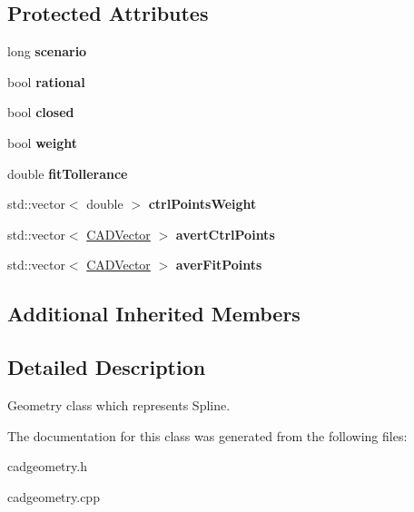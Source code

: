 \subsection*{Protected Attributes}
\begin{DoxyCompactItemize}
\item 
long {\bfseries scenario}\hypertarget{class_c_a_d_spline_a3694c63ea80eef24a1a31a0da4d3ef64}{}\label{class_c_a_d_spline_a3694c63ea80eef24a1a31a0da4d3ef64}

\item 
bool {\bfseries rational}\hypertarget{class_c_a_d_spline_a0b52ed3223ee5db7381468131b031d64}{}\label{class_c_a_d_spline_a0b52ed3223ee5db7381468131b031d64}

\item 
bool {\bfseries closed}\hypertarget{class_c_a_d_spline_af28e1bca878a13fdfa0d8ad48168b763}{}\label{class_c_a_d_spline_af28e1bca878a13fdfa0d8ad48168b763}

\item 
bool {\bfseries weight}\hypertarget{class_c_a_d_spline_ae8d3331548fdc5558603d9c5dde9eafc}{}\label{class_c_a_d_spline_ae8d3331548fdc5558603d9c5dde9eafc}

\item 
double {\bfseries fit\+Tollerance}\hypertarget{class_c_a_d_spline_a1b6b07b03f68c241dc1e4829172b36a7}{}\label{class_c_a_d_spline_a1b6b07b03f68c241dc1e4829172b36a7}

\item 
std\+::vector$<$ double $>$ {\bfseries ctrl\+Points\+Weight}\hypertarget{class_c_a_d_spline_ad4fb6172b48df3e9d9dc0d37b3efec56}{}\label{class_c_a_d_spline_ad4fb6172b48df3e9d9dc0d37b3efec56}

\item 
std\+::vector$<$ \hyperlink{class_c_a_d_vector}{C\+A\+D\+Vector} $>$ {\bfseries avert\+Ctrl\+Points}\hypertarget{class_c_a_d_spline_a1e6ba0c33afe2a48cff959df91548cde}{}\label{class_c_a_d_spline_a1e6ba0c33afe2a48cff959df91548cde}

\item 
std\+::vector$<$ \hyperlink{class_c_a_d_vector}{C\+A\+D\+Vector} $>$ {\bfseries aver\+Fit\+Points}\hypertarget{class_c_a_d_spline_a47265225f19e08e6409842508b25208d}{}\label{class_c_a_d_spline_a47265225f19e08e6409842508b25208d}

\end{DoxyCompactItemize}
\subsection*{Additional Inherited Members}


\subsection{Detailed Description}
Geometry class which represents Spline. 

The documentation for this class was generated from the following files\+:\begin{DoxyCompactItemize}
\item 
cadgeometry.\+h\item 
cadgeometry.\+cpp\end{DoxyCompactItemize}
